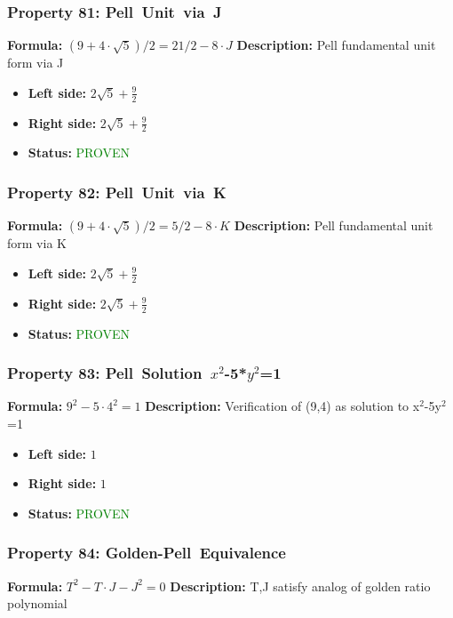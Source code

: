 \subsubsection*{Property 81: Pell~Unit~via~J}
\textbf{Formula:} $(9+4 \cdot \sqrt{5})/2 = 21/2 - 8 \cdot J$
\textbf{Description:} Pell fundamental unit form via J

\begin{itemize}
\item \textbf{Left side:} $2 \sqrt{5} + \frac{9}{2}$
\item \textbf{Right side:} $2 \sqrt{5} + \frac{9}{2}$
\item \textbf{Status:} \textcolor{green}{PROVEN}
\end{itemize}

\subsubsection*{Property 82: Pell~Unit~via~K}
\textbf{Formula:} $(9+4 \cdot \sqrt{5})/2 = 5/2 - 8 \cdot K$
\textbf{Description:} Pell fundamental unit form via K

\begin{itemize}
\item \textbf{Left side:} $2 \sqrt{5} + \frac{9}{2}$
\item \textbf{Right side:} $2 \sqrt{5} + \frac{9}{2}$
\item \textbf{Status:} \textcolor{green}{PROVEN}
\end{itemize}

\subsubsection*{Property 83: Pell~Solution~$x^{2}$-5*$y^{2}$=1}
\textbf{Formula:} $9^2 - 5 \cdot 4^2 = 1$
\textbf{Description:} Verification of (9,4) as solution to x$^2$-5y$^2$=1

\begin{itemize}
\item \textbf{Left side:} $1$
\item \textbf{Right side:} $1$
\item \textbf{Status:} \textcolor{green}{PROVEN}
\end{itemize}

\subsubsection*{Property 84: Golden-Pell~Equivalence}
\textbf{Formula:} $T^2 - T \cdot J - J^2 = 0$
\textbf{Description:} T,J satisfy analog of golden ratio polynomial

